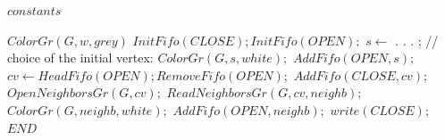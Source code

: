 \documentclass{book} %
\begin{document}
\begin{latin}
    
    \begin{algorithm}
        \begin{algorithmic}
            \STATE $constants$



                \STATE $ColorGr(G, w, grey)$
            \ENDFOR
            \STATE $InitFifo(CLOSE); InitFifo(OPEN);$
            \STATE $s \leftarrow$ . . . ; // choice of the initial vertex:
            \STATE $ColorGr(G, s, white);$
            \STATE $AddFifo(OPEN, s);$
                \STATE $cv \leftarrow HeadFifo(OPEN); RemoveFifo(OPEN);$
                \STATE $AddFifo(CLOSE, cv);$
                \STATE $OpenNeighborsGr(G, cv);$
                    \STATE $ReadNeighborsGr(G, cv, neighb);$
                        \STATE $ColorGr(G, neighb, white);$
                        \STATE $AddFifo(OPEN, neighb);$
                    \ENDIF
                \ENDWHILE
            \ENDWHILE
            \STATE $write(CLOSE);$
            \STATE $END$
        \end{algorithmic}
    \end{algorithm}
        
\end{latin}
\end{document}
